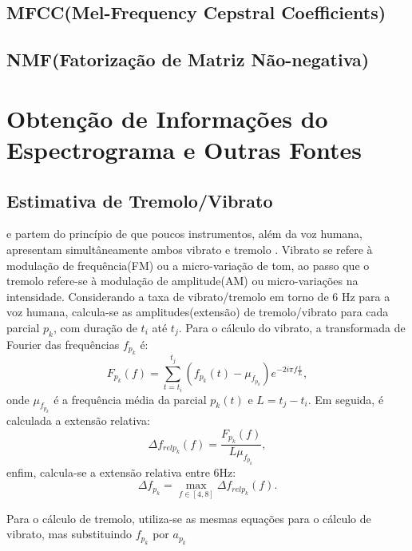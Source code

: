\documentclass[
	12pt,				%
	openright,			%
	oneside,			%
	a4paper,			%
	english,			%
	brazil,				%
	]{abntex2}
\begin{document}
\subsection{MFCC(Mel-Frequency Cepstral Coefficients)}

\subsection{NMF(Fatorização de Matriz Não-negativa)}

\section{Obtenção de Informações do Espectrograma e Outras Fontes}
\subsection{Estimativa de Tremolo/Vibrato}
 e  partem do princípio de que poucos instrumentos, além da voz humana, apresentam simultâneamente ambos vibrato e tremolo \cite{VerfailleGD2005}. Vibrato se refere à modulação de frequência(FM) ou a micro-variação de tom, ao passo que o tremolo refere-se à modulação de amplitude(AM) ou micro-variações na intensidade. Considerando a taxa de vibrato/tremolo em torno de 6 Hz para a voz humana, calcula-se as amplitudes(extensão) de tremolo/vibrato para cada parcial $p_k$, com duração de $t_i$ até $t_j$. Para o cálculo do vibrato, a transformada de Fourier das frequências $f_{p_k}$ é:
\begin{equation}
    F_{p_k}(f) = \displaystyle\sum_{t = t_i}^{t_j}(f_{p_k}(t) - \mu_{f_{p_k}}) e^{-2i\pi f\frac{t}{L}}, 
\end{equation}
onde $\mu_{f_{p_k}}$ é a frequência média da parcial $p_k(t)$ e $L = t_j - t_i$. Em seguida, é calculada a extensão relativa:
\begin{equation}
    \Delta f_{relp_k}(f) = \frac{F_{p_k}(f)}{L\mu_{f_{p_k}}}, 
\end{equation}
enfim, calcula-se a extensão relativa entre 6Hz:
\begin{equation}
    \Delta f_{p_k} = \max_{f\in [4, 8]}\Delta f_{relp_k}(f).
\end{equation}

Para o cálculo de tremolo, utiliza-se as mesmas equações para o cálculo de vibrato, mas substituindo $f_{p_k}$ por $a_{p_k}$
\end{document}
